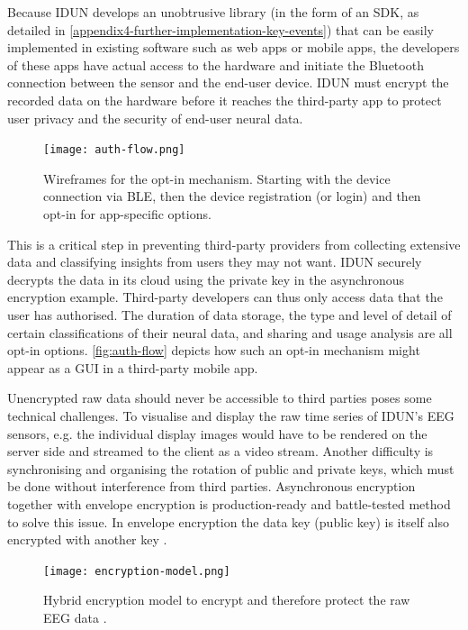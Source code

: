 Because IDUN develops an unobtrusive library (in the form of an SDK, as detailed in \autoref{appendix4-further-implementation-key-events}) that can be easily implemented in existing software such as web apps or mobile apps, the developers of these apps have actual access to the hardware and initiate the Bluetooth connection between the sensor and the end-user device. IDUN must encrypt the recorded data on the hardware before it reaches the third-party app to protect user privacy and the security of end-user neural data. 

\begin{figure}[!ht]
  \centering
  \texttt{[image: auth-flow.png]}
  \caption{Wireframes for the opt-in mechanism. Starting with the device connection via BLE, then the device registration (or login) and then opt-in for app-specific options.}
  \label{fig:auth-flow}
\end{figure}

This is a critical step in preventing third-party providers from collecting extensive data and classifying insights from users they may not want. IDUN securely decrypts the data in its cloud using the private key in the asynchronous encryption example. Third-party developers can thus only access data that the user has authorised. The duration of data storage, the type and level of detail of certain classifications of their neural data, and sharing and usage analysis are all opt-in options. \autoref{fig:auth-flow} depicts how such an opt-in mechanism might appear as a GUI in a third-party mobile app.

Unencrypted raw data should never be accessible to third parties poses some technical challenges. To visualise and display the raw time series of IDUN's EEG sensors, e.g. the individual display images would have to be rendered on the server side and streamed to the client as a video stream. Another difficulty is synchronising and organising the rotation of public and private keys, which must be done without interference from third parties. Asynchronous encryption together with envelope encryption is production-ready and battle-tested method to solve this issue. In envelope encryption the data key (public key) is itself also encrypted with another key \citep{google_cloud_envelope_nodate}. 

\begin{figure}[!ht]
  \centering
  \texttt{[image: encryption-model.png]}
  \caption[Hybrid encryption model to encrypt and therefore protect the raw EEG data]{Hybrid encryption model to encrypt and therefore protect the raw EEG data \citep{idun_guardian_nodate}.}
  \label{fig:encryption-model}
\end{figure}

